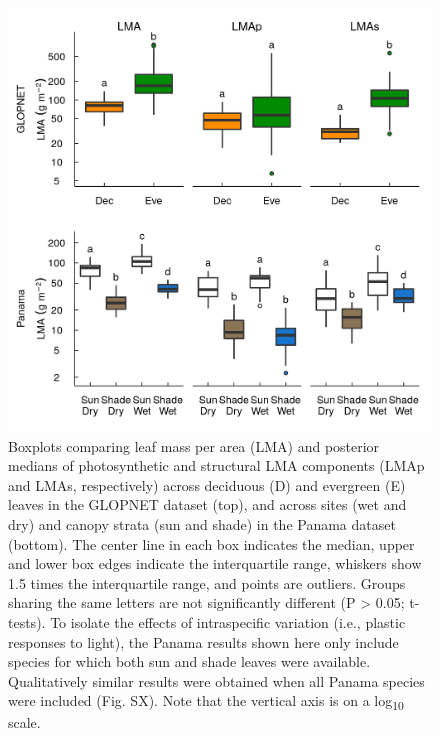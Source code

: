 \documentclass[
  12pt,
  a4paper,
,tablecaptionabove
]{scrartcl}
\begin{document}
\newpage

\begin{figure}

{\centering \includegraphics{../figs/box_main.png}

}

\caption{\label{fig-boxplt}Boxplots comparing leaf mass per area (LMA)
and posterior medians of photosynthetic and structural LMA components
(LMAp and LMAs, respectively) across deciduous (D) and evergreen (E)
leaves in the GLOPNET dataset (top), and across sites (wet and dry) and
canopy strata (sun and shade) in the Panama dataset (bottom). The center
line in each box indicates the median, upper and lower box edges
indicate the interquartile range, whiskers show 1.5 times the
interquartile range, and points are outliers. Groups sharing the same
letters are not significantly different (P \textgreater{} 0.05;
t-tests). To isolate the effects of intraspecific variation (i.e.,
plastic responses to light), the Panama results shown here only include
species for which both sun and shade leaves were available.
Qualitatively similar results were obtained when all Panama species were
included (Fig. SX). Note that the vertical axis is on a
log\textsubscript{10} scale.}

\end{figure}
\end{document}
